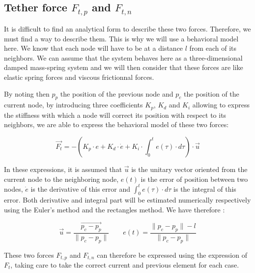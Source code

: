 \subsection{Tether force $F_{t, p}$ and $F_{t, n}$}

It is difficult to find an analytical form to describe these two forces. Therefore, we must find a way to describe them. This is why we will use a behavioral model here. We know that each node will have to be at a distance $l$ from each of its neighbors. We can assume that the system behaves here as a three-dimensional damped mass-spring system and we will then consider that these forces are like elastic spring forces and viscous frictionnal forces.

By noting then $p_{p}$ the position of the previous node and $p_{c}$ the position of the current node, by introducing three coefficients $K_p$, $K_d$ and $K_i$ allowing to express the stiffness with which a node will correct its position with respect to its neighbors, we are able to express the behavioral model of these two forces:

$$\overrightarrow{F_{t}} = - \left(K_p \cdot e + K_d \cdot \dot e + K_i \cdot \int_{0}^te(\tau) \cdot d\tau \right) \cdot \overrightarrow{u}$$

In these expressions, it is assumed that $\overrightarrow{u}$ is the unitary vector oriented from the current node to the neighboring node, $e(t)$ is the error of position between two nodes, $\dot e$ is the derivative of this error and $\int_{0}^te(\tau) \cdot d\tau$ is the integral of this error. Both derivative and integral part will be estimated numerically respectively using the Euler's method and the rectangles method. We have therefore :

$$\overrightarrow{u} = \frac{\overrightarrow{p_c - p_p}}{\|p_c - p_p\|} \qquad e(t) = \frac{\|p_c - p_p\| - l}{\|p_c - p_p\|}$$

These two forces $F_{t, p}$ and $F_{t, n}$ can therefore be expressed using the expression of $F_t$, taking care to take the correct current and previous element for each case.